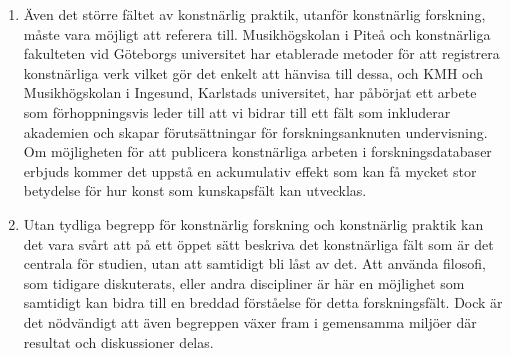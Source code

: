 \documentclass[11pt]{article}
\begin{document}
\begin{enumerate}
  \item Även det större fältet av konstnärlig praktik, utanför
    konstnärlig forskning, måste vara möjligt att referera
    till. Musikhögskolan i Piteå och konstnärliga fakulteten vid
    Göteborgs universitet har etablerade metoder för att registrera
    konstnärliga verk vilket gör det enkelt att hänvisa till dessa,
    och KMH och Musikhögskolan i Ingesund, Karlstads universitet, har
    påbörjat ett arbete som förhoppningsvis leder till att vi bidrar
    till ett fält som inkluderar akademien och skapar förutsättningar
    för forskningsanknuten undervisning. Om möjligheten för att
    publicera konstnärliga arbeten i forskningsdatabaser erbjuds
    kommer det uppstå en ackumulativ effekt som kan få mycket stor
    betydelse för hur konst som kunskapsfält kan utvecklas.

  \item Utan tydliga begrepp för konstnärlig forskning och konstnärlig
    praktik kan det vara svårt att på ett öppet sätt beskriva det
    konstnärliga fält som är det centrala för studien, utan att
    samtidigt bli låst av det. Att använda filosofi, som tidigare
    diskuterats, eller andra discipliner är här en möjlighet som
    samtidigt kan bidra till en breddad förståelse för detta
    forskningsfält. Dock är det nödvändigt att även begreppen växer
    fram i gemensamma miljöer där resultat och diskussioner delas.
\end{enumerate}
\end{document}
